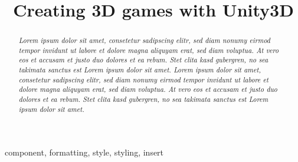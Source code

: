 \documentclass[conference]{IEEEtran}
\begin{document}
\title{Creating 3D games with Unity3D}

\author{
\and
{}
\and
{}
}

\maketitle

\begin{abstract}
\emph{Lorem ipsum dolor sit amet, consetetur sadipscing elitr, sed diam nonumy eirmod tempor invidunt ut labore et dolore magna aliquyam erat, sed diam voluptua. At vero eos et accusam et justo duo dolores et ea rebum. Stet clita kasd gubergren, no sea takimata sanctus est Lorem ipsum dolor sit amet. Lorem ipsum dolor sit amet, consetetur sadipscing elitr, sed diam nonumy eirmod tempor invidunt ut labore et dolore magna aliquyam erat, sed diam voluptua. At vero eos et accusam et justo duo dolores et ea rebum. Stet clita kasd gubergren, no sea takimata sanctus est Lorem ipsum dolor sit amet.}
\end{abstract}

\begin{IEEEkeywords}
component, formatting, style, styling, insert
\end{IEEEkeywords}
\end{document}
